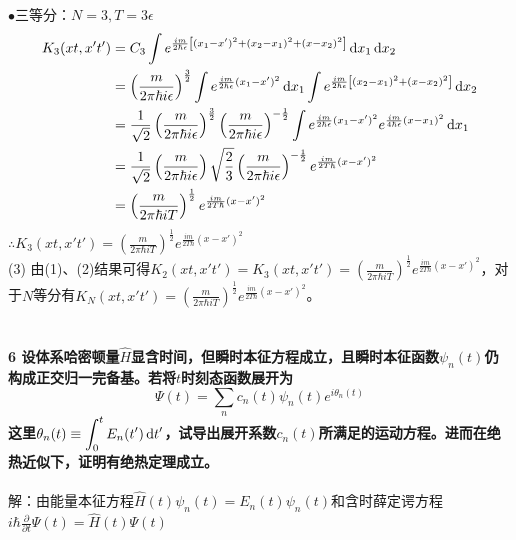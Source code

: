\documentclass[12pt]{article}
\numberwithin{equation}{section}	 %
\begin{document}
\begin{spacing}{1.5}
$\bullet$三等分：$N=3,T=3\epsilon$
\begin{equation}
\begin{aligned}
K_{3}(xt,x't') &= C_{3} \int e^{\frac{im}{2\hbar \epsilon}\left[(x_{1}-x')^{2} + (x_{2}-x_{1})^{2} + (x-x_{2})^{2} \right]} \mathop{}\!\mathrm{d} x_{1}\mathop{}\!\mathrm{d} x_{2}\\
&= \left(\frac{m}{2\pi\hbar i\epsilon}\right)^{\frac{3}{2}} \int e^{\frac{im}{2\hbar \epsilon}(x_{1}-x')^{2}} \mathop{}\!\mathrm{d} x_{1} \int e^{\frac{im}{2\hbar \epsilon}\left[ (x_{2}-x_{1})^{2} + (x-x_{2})^{2} \right]} \mathop{}\!\mathrm{d} x_{2} \\
&= \frac{1}{\sqrt{2}} \left(\frac{m}{2\pi\hbar i\epsilon}\right)^{\frac{3}{2}} \left(\frac{m}{2\pi\hbar i\epsilon}\right)^{-\frac{1}{2}} \int e^{\frac{im}{2\hbar \epsilon}(x_{1}-x')^{2}} e^{\frac{im}{4\hbar \epsilon}(x-x_{1})^{2}} \mathop{}\!\mathrm{d} x_{1} \\
&= \frac{1}{\sqrt{2}} \left(\frac{m}{2\pi\hbar i\epsilon}\right) \sqrt{\frac{2}{3}} \left(\frac{m}{2\pi\hbar i\epsilon}\right)^{-\frac{1}{2}} e^{\frac{im}{2T\hbar}(x-x')^{2}} \\
&= \left(\frac{m}{2\pi\hbar iT}\right)^{\frac{1}{2}} e^{\frac{im}{2T\hbar}(x-x')^{2}}
\end{aligned}
\end{equation}
$\therefore \displaystyle K_{3}(xt,x't') = \left(\frac{m}{2\pi\hbar iT}\right)^{\frac{1}{2}} e^{\frac{im}{2T\hbar}(x-x')^{2}}$\\
(3) \quad 由(1)、(2)结果可得$\displaystyle K_{2}(xt,x't') = K_{3}(xt,x't') = \left(\frac{m}{2\pi\hbar iT}\right)^{\frac{1}{2}} e^{\frac{im}{2T\hbar}(x-x')^{2}}$，对于$N$等分有$\displaystyle K_{N}(xt,x't') = \left(\frac{m}{2\pi\hbar iT}\right)^{\frac{1}{2}} e^{\frac{im}{2T\hbar}(x-x')^{2}}$。\\
~\\
~\\
\textbf{6 \quad 设体系哈密顿量$\hat{H}$显含时间，但瞬时本征方程成立，且瞬时本征函数$\psi_{n}(t)$仍构成正交归一完备基。若将$t$时刻态函数展开为
\begin{equation}\nonumber 		%
\Psi(t) = \sum_{n}c_{n}(t)\psi_{n}(t)e^{i\theta_{n}(t)}
\end{equation}
这里$\displaystyle \theta_{n}(t) \equiv \int^{t}_{0}E_{n}(t')\mathop{}\!\mathrm{d} t'$，试导出展开系数$c_{n}(t)$所满足的运动方程。进而在绝热近似下，证明有绝热定理成立。}\\
~\\
解：由能量本征方程$\hat{H}(t)\psi_{n}(t) = E_{n}(t)\psi_{n}(t)$和含时薛定谔方程$\displaystyle i\hbar\frac{\partial}{\partial t}\Psi(t) = \hat{H}(t)\Psi(t)$\\

\end{spacing}
\end{document}
